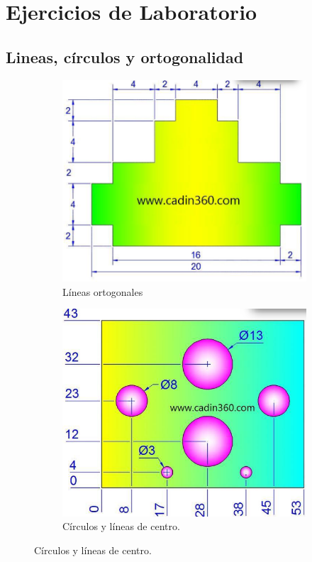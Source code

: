 \documentclass[letterpaper,pdftex]{article}
\begin{document}
\section{Ejercicios de Laboratorio}

\subsection{Lineas, círculos y ortogonalidad}

\begin{figure}[h]
     \centering
     \begin{subfigure}[b]{0.45\textwidth}
         \centering
         \includegraphics[width=\textwidth]{graph1}
         \caption{Líneas ortogonales}
         \label{fig:simple1}
     \end{subfigure}
     \hfill
     \begin{subfigure}[b]{0.45\textwidth}
         \centering
         \includegraphics[width=\textwidth]{graph2}
         \caption{Círculos y líneas de centro.}
         \label{fig:simple2}
     \end{subfigure}
\end{figure}
\end{document}
